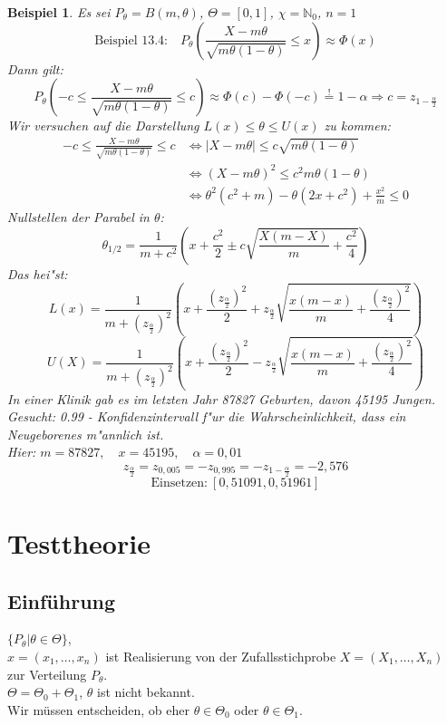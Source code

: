 \documentclass[a4paper,11pt]{book}
\newcommand{\N}{{\mathbb N}}
\newtheorem{Bsp}{Beispiel}[chapter]
\theoremstyle{nonumberplain}
\begin{document}
\begin{Bsp}
Es sei $P_\theta=B(m,\theta)$, $\Theta= [0,1]$, $\chi=\N_0$, $n=1$
\[\text{Beispiel 13.4:}\quad P_\theta\left(\frac{X-m\theta}{\sqrt{m\theta(1-\theta)}}\leq x\right)\approx \Phi(x)\]
Dann gilt: 
\[P_\theta\left(-c \leq \frac{X-m\theta}{\sqrt{m\theta(1-\theta)}}\leq c\right)\approx \Phi(c)-\Phi(-c) \stackrel{!}{=} 1-\alpha \Rightarrow c = z_{1-\frac\alpha2}\]
Wir versuchen auf die Darstellung $L(x) \le \theta \le U(x)$ zu kommen:
\begin{align*}
-c\leq \frac{X-m\theta}{\sqrt{m\theta(1-\theta)}}\leq c &\Leftrightarrow |X-m\theta|\leq c\sqrt{m\theta(1-\theta)}\\
&\Leftrightarrow (X-m\theta)^2\leq c^2 m \theta(1-\theta)\\
&\Leftrightarrow \theta^2(c^2+m)-\theta(2x+c^2)+\frac{x^2}{m}\leq 0 
\end{align*}
Nullstellen der Parabel in $\theta$:
\[\theta_{1/2}=\frac{1}{m+c^2}\left(x+\frac{c^2}{2} \pm c\sqrt{\frac{X(m-X)}{m}+\frac{c^2}{4} }\right)\]
Das hei"st:
\[L(x)=\frac{1}{m+(z_{\frac{\alpha}{2}})^2}\left(x+\frac{(z_{\frac{\alpha}{2}})^2}{2} + z_{\frac{\alpha}{2}}\sqrt{\frac{x(m-x)}{m}+\frac{(z_{\frac{\alpha}{2}})^2}{4} }\right)\]
\[U(X)=\frac{1}{m+(z_{\frac{\alpha}{2}})^2}\left(x+\frac{(z_{\frac{\alpha}{2}})^2}{2} - z_{\frac{\alpha}{2}}\sqrt{\frac{x(m-x)}{m}+\frac{(z_{\frac{\alpha}{2}})^2}{4} }\right)\]
In einer Klinik gab es im letzten Jahr 87827 Geburten, davon 45195 Jungen.\\
Gesucht: 0.99 - Konfidenzintervall f"ur die Wahrscheinlichkeit, dass ein Neugeborenes m"annlich ist.\\
Hier: $m=87827, \quad x=45195, \quad \alpha=0,01$
\[z_{\frac{\alpha}{2}}= z_{0,005} = -z_{0,995} = -z_{1-\frac{\alpha}{2}}=-2,576\]
\[\text{Einsetzen:} \ [0,51091, 0,51961] \]
\end{Bsp}

\chapter{Testtheorie}
\section[Einführung]{Einführung}
$\{P_\theta |\theta\in \Theta\}$,\\
$x=(x_1,\ldots,x_n)$ ist Realisierung von der Zufallsstichprobe $X=(X_1,\dots,X_n)$ zur Verteilung $P_\theta$.\\
$\Theta=\Theta_0+\Theta_1$, $\theta$ ist nicht bekannt.\\
Wir müssen entscheiden, ob eher $\theta \in \Theta_0$ oder $\theta \in \Theta_1$.\\
\end{document}
